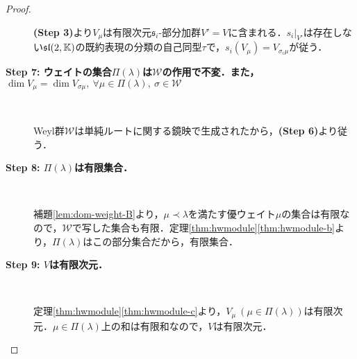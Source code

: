 \documentclass[rep_main]{subfiles}
\begin{document}
\begin{proof}
\begin{description}
		\textbf{(Step 3)}より$V_\mu$は有限次元$\mathfrak{s}_i$-部分加群$V' = V$に含まれる．$s_i|_{V'}$は存在しない$\mathfrak{sl}(2, \mathbb{K})$の既約表現の分類の自己同型$\tau$で，$s_i(V_\mu) = V_{\sigma_i\mu}$が従う．
		\item[\textbf{Step 7: ウェイトの集合$\Pi(\lambda)$は$\mathscr{W}$の作用で不変．また，$\dim V_\mu = \dim V_{\sigma\mu},\ \forall \mu \in \Pi(\lambda),\ \sigma \in \mathscr{W}$}]　
		
		Weyl群$\mathscr{W}$は単純ルートに関する鏡映で生成されたから，\textbf{(Step 6)}より従う．
		\item[\textbf{Step 8: $\Pi(\lambda)$は有限集合．}]　
			
		補題\ref{lem:dom-weight-B}より，$\mu \prec \lambda$を満たす優ウェイト$\mu$の集合は有限なので，$\mathscr{W}$で写した集合も有限．定理\ref{thm:hwmodule}\ref{thm:hwmodule-b}より，$\Pi(\lambda)$はこの部分集合だから，有限集合．
		\item[\textbf{Step 9: $V$は有限次元．}]　
		
		定理\ref{thm:hwmodule}\ref{thm:hwmodule-c}より，$V_\mu\ (\mu \in \Pi(\lambda))$は有限次元．$\mu \in \Pi(\lambda)$上の和は有限和なので，$V$は有限次元．
	\end{description}
\end{proof}
\end{document}

